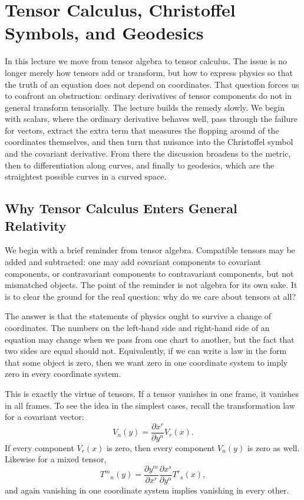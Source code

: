 \chapter{Tensor Calculus, Christoffel Symbols, and Geodesics}

In this lecture we move from tensor algebra to tensor calculus. The issue is no longer merely how tensors add or transform, but how to express physics so that the truth of an equation does not depend on coordinates. That question forces us to confront an obstruction: ordinary derivatives of tensor components do not in general transform tensorially. The lecture builds the remedy slowly. We begin with scalars, where the ordinary derivative behaves well, pass through the failure for vectors, extract the extra term that measures the flopping around of the coordinates themselves, and then turn that nuisance into the Christoffel symbol and the covariant derivative. From there the discussion broadens to the metric, then to differentiation along curves, and finally to geodesics, which are the straightest possible curves in a curved space.

\section{Why Tensor Calculus Enters General Relativity}

We begin with a brief reminder from tensor algebra. Compatible tensors may be added and subtracted: one may add covariant components to covariant components, or contravariant components to contravariant components, but not mismatched objects. The point of the reminder is not algebra for its own sake. It is to clear the ground for the real question: why do we care about tensors at all?

The answer is that the statements of physics ought to survive a change of coordinates. The numbers on the left-hand side and right-hand side of an equation may change when we pass from one chart to another, but the fact that two sides are equal should not. Equivalently, if we can write a law in the form that some object is zero, then we want zero in one coordinate system to imply zero in every coordinate system.

This is exactly the virtue of tensors. If a tensor vanishes in one frame, it vanishes in all frames. To see the idea in the simplest cases, recall the transformation law for a covariant vector:
\begin{equation}
V_n(y)=\frac{\partial x^r}{\partial y^n}V_r(x).
\end{equation}
If every component \(V_r(x)\) is zero, then every component \(V_n(y)\) is zero as well. Likewise for a mixed tensor,
\begin{equation}
T^m{}_n(y)=\frac{\partial y^m}{\partial x^r}\frac{\partial x^s}{\partial y^n}T^r{}_s(x),
\end{equation}
and again vanishing in one coordinate system implies vanishing in every other.

